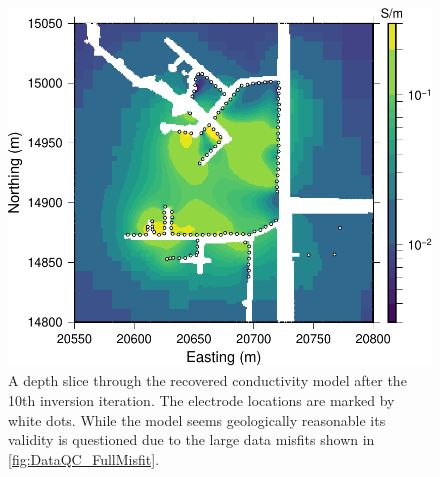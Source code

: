 \documentclass[final,authoryear,5p,times,twocolumn]{elsarticle}
\begin{document}
\begin{figure} [!ht]
    \begin{center}
    \includegraphics[trim=0cm 0cm 0cm 0cm, clip=true,width=0.95\linewidth]{./Figures/Fig3.pdf}
    \end{center}
\caption{A depth slice through the recovered conductivity model after the 10th inversion iteration. The electrode locations are marked by white dots. While the model seems geologically reasonable its validity is questioned due to the large data misfits shown in \ref{fig:DataQC_FullMisfit}.}
\label{fig:DataQC_FullInvResult}
\end{figure}
\end{document}
